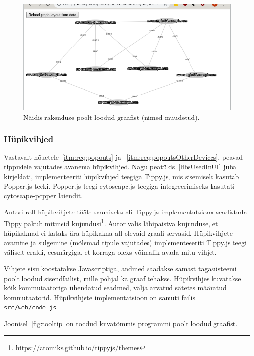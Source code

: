 \documentclass[12pt]{article}
\begin{document}
\begin{figure} [ht] %
\begin{center}
\includegraphics[width=1\textwidth]{graph}
    \caption{Näidis rakenduse poolt loodud graafist (nimed muudetud).}
\label{fig:graph}
\end{center}
\end{figure}

\subsubsection{Hüpikvihjed}
Vastavalt nõuetele~\ref{itm:req:popouts} ja ~\ref{itm:req:popoutsOtherDevices}, peavad tippudele
vajutades avanema hüpikvihjed.
Nagu peatükis~\ref{libsUsedInUI} juba kirjeldati, implementeeriti hüpikvihjed teegiga Tippy.js, mis
sisemiselt kasutab Popper.js teeki.
Popper.js teegi cytoscape.js teegiga integreerimiseks kasutati cytoscape-popper laiendit.

Autori roll hüpikvihjete tööle saamiseks oli Tippy.js implementatsioon seadistada.
Tippy pakub mitmeid kujundusi\footnote{\url{https://atomiks.github.io/tippyjs/themes}}.
Autor valis läbipaistva kujunduse, et hüpikaknad ei kataks ära hüpikakna all olevaid graafi
servasid.
Hüpikvihjete avamine ja sulgemine (mõlemad tipule vajutades) implementeeeriti Tippy.js teegi
väliselt eraldi, eesmärgiga, et korraga oleks võimalik avada mitu vihjet.

Vihjete sisu koostatakse Javascriptiga, andmed saadakse samast tagasüsteemi poolt loodud
sisendfailist, mille põhjal ka graaf tehakse.
Hüpikvihjes kuvatakse kõik kommutaatoriga ühendatud seadmed, välja arvatud sätetes määratud
kommutaatorid.
Hüpikvihjete implementatsioon on samuti failis \texttt{src/web/code.js}.

Joonisel~\ref{fig:tooltip} on toodud kuvatõmmis programmi poolt loodud graafist.
\end{document}
